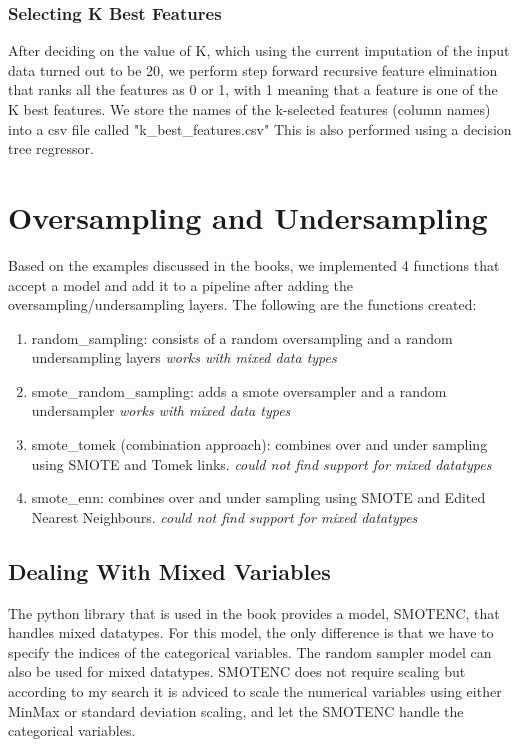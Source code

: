 \documentclass{article}
\begin{document}
\subsubsection{Selecting K Best Features}
After deciding on the value of K, which using the current imputation of the input data turned out to be 20, we perform step forward recursive feature elimination that ranks all the features as 0 or 1, with 1 meaning that a feature is one of the K best features. We store the names of the k-selected features (column names) into a csv file called "k\_best\_features.csv" This is also performed using a decision tree regressor.

\section{Oversampling and Undersampling}
Based on the examples discussed in the books, we implemented 4 functions that accept a model and add it to a pipeline after adding the oversampling/undersampling layers. The following are the functions created:

\begin{enumerate}
    \item random\_sampling: consists of a random oversampling and a random undersampling layers \textit{works with mixed data types}
    \item smote\_random\_sampling: adds a smote oversampler and a random undersampler \textit{works with mixed data types}
    \item smote\_tomek (combination approach): combines over and under sampling using SMOTE and Tomek links. \textit{could not find support for mixed datatypes}
    \item smote\_enn: combines over and under sampling using SMOTE and Edited Nearest Neighbours. \textit{could not find support for mixed datatypes}
\end{enumerate}

\subsection{Dealing With Mixed Variables}
The python library that is used in the book provides a model, SMOTENC, that handles mixed datatypes. For this model, the only difference is that we have to specify the indices of the categorical variables. The random sampler model can also be used for mixed datatypes. SMOTENC does not require scaling but according to my search it is adviced to scale the numerical variables using either MinMax or standard deviation scaling, and let the SMOTENC handle the categorical variables.
\end{document}
